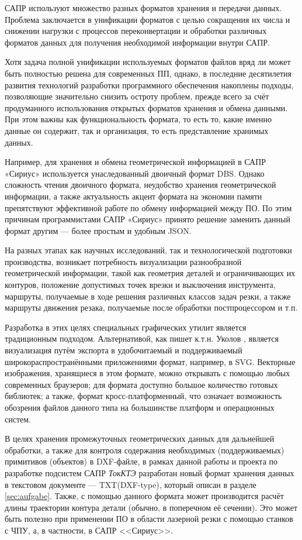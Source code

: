 САПР используют множество разных форматов хранения и передачи данных. Проблема заключается в унификации форматов с целью сокращения их числа и снижении нагрузки с процессов переконвертации и обработки различных форматов данных для получения необходимой информации внутри САПР.

Хотя задача полной унификации используемых форматов файлов вряд ли может быть полностью решена для современных  ПП, однако, в последние десятилетия развития технологий разработки программного обеспечения накоплены подходы, позволяющие значительно снизить остроту проблем, прежде всего за счёт продуманного использования открытых форматов хранения и обмена данными. При этом важны как функциональность формата, то есть то, какие именно данные он содержит, так и организация, то есть представление хранимых данных.

Например, для хранения и обмена геометрической информацией в САПР «Сириус» используется унаследованный двоичный формат DBS. Однако сложность чтения двоичного формата, неудобство хранения геометрической информации, а также актуальность акцент формата на экономии памяти препятствуют эффективной работе по обмену информацией между ПО. По этим причинам программистами САПР «Сириус» принято решение заменить данный формат другим --- более простым и удобным JSON.

На разных этапах как научных исследований, так и технологической подготовки производства, возникает потребность визуализации разнообразной геометрической информации, такой как геометрия деталей и ограничивающих их контуров, положение допустимых точек врезки и выключения инструмента, маршруты, получаемые в ходе решения различных классов задач резки, а также маршруты движения резака, получаемые после обработки постпроцессором и т.п.

Разработка в этих целях специальных графических утилит является традиционным подходом. Альтернативой, как пишет к.т.н. Уколов \cite{ukoloff}, является визуализация путём экспорта в удобочитаемый и поддерживаемый широкораспространёнными приложениями формат, например, в SVG. Векторные изображения, хранящиеся в этом формате, можно открывать с помощью любых современных браузеров; для формата доступно большое количество готовых библиотек; а также, формат кросс-платформенный, что означает возможность обозрения файлов данного типа на большинстве платформ и операционных систем.

В целях хранения промежуточных геометрических данных для дальнейшей обработки, а также для контроля содержания необходимых (поддерживаемых) примитивов (объектов) в DXF-файле, в рамках данной работы и проекта по разработке подсистем САПР \textit{ТокКТЭ} разработан новый формат хранения данных в текстовом документе --- TXT(DXF-type), который описан в разделе \ref{sec:aufgabe}. Также, с помощью данного формата может производится расчёт длины траектории  контура детали (обычно, в поперечном её сечении). Это может быть полезно при применении ПО в области лазерной резки с помощью станков с ЧПУ, а, в частности, в САПР <<Сириус>>.

